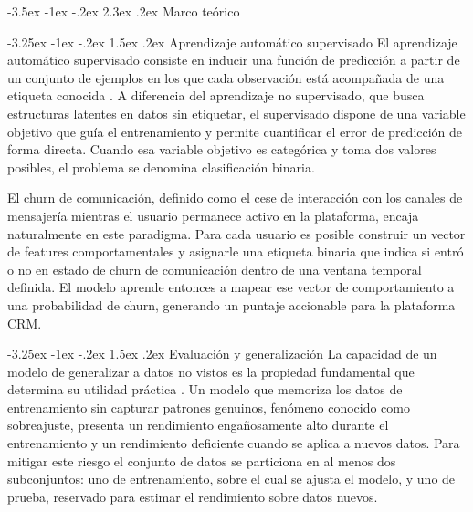 \documentclass[11pt,a4paper]{article}
\makeatletter
\renewcommand\section{\@startsection{section}{1}{\z@}%
  {-3.5ex \@plus -1ex \@minus -.2ex}%
  {2.3ex \@plus.2ex}%
  {\normalfont\normalsize\centering}}
\renewcommand\subsection{\@startsection{subsection}{2}{\z@}%
  {-3.25ex \@plus -1ex \@minus -.2ex}%
  {1.5ex \@plus .2ex}%
  {\normalfont\normalsize\itshape}}
\makeatother
\begin{document}
 
\section{Marco teórico}
 
\subsection{Aprendizaje automático supervisado}
El aprendizaje automático supervisado consiste en inducir una función de predicción a partir de un conjunto de ejemplos en los que cada observación está acompañada de una etiqueta conocida \cite{hastie2009elements}. A diferencia del aprendizaje no supervisado, que busca estructuras latentes en datos sin etiquetar, el supervisado dispone de una variable objetivo que guía el entrenamiento y permite cuantificar el error de predicción de forma directa. Cuando esa variable objetivo es categórica y toma dos valores posibles, el problema se denomina clasificación binaria.
 
El churn de comunicación, definido como el cese de interacción con los canales de mensajería mientras el usuario permanece activo en la plataforma, encaja naturalmente en este paradigma. Para cada usuario es posible construir un vector de features comportamentales y asignarle una etiqueta binaria que indica si entró o no en estado de churn de comunicación dentro de una ventana temporal definida. El modelo aprende entonces a mapear ese vector de comportamiento a una probabilidad de churn, generando un puntaje accionable para la plataforma CRM.
 
\subsection{Evaluación y generalización}
La capacidad de un modelo de generalizar a datos no vistos es la propiedad fundamental que determina su utilidad práctica \cite{hastie2009elements}. Un modelo que memoriza los datos de entrenamiento sin capturar patrones genuinos, fenómeno conocido como sobreajuste, presenta un rendimiento engañosamente alto durante el entrenamiento y un rendimiento deficiente cuando se aplica a nuevos datos. Para mitigar este riesgo el conjunto de datos se particiona en al menos dos subconjuntos: uno de entrenamiento, sobre el cual se ajusta el modelo, y uno de prueba, reservado para estimar el rendimiento sobre datos nuevos.
 
\end{document}
